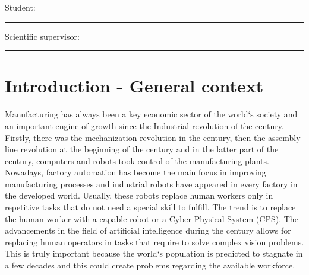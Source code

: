 \documentclass[12pt,a4paper,twoside]{report}
\newcommand{\uline}[1]{\rule[0pt]{#1}{0.4pt}}
\begin{document}
\hspace{6cm} Student: \uline{6cm} 

\vspace{0.5cm}

\hspace{6cm} Scientific supervisor: \uline{5cm} 




\newpage
{}
\tableofcontents
\newpage



\chapter{Introduction - General context}
\pagestyle{headings}
\setcounter{page}{1}

Manufacturing has always been a key economic sector of the world`s society and an important engine of growth since the Industrial revolution of the  century. Firstly,  there was the mechanization revolution in the  century, then the assembly line revolution at the beginning of the  century and in the latter part of the  century, computers and robots took control of the manufacturing plants. Nowadays, factory automation has become the main focus in improving manufacturing processes and industrial robots have appeared in every factory in the developed world. Usually, these robots replace human workers only in repetitive tasks that do not need a special skill to fulfill. The trend is to replace the human worker with a capable robot or a Cyber Physical System (CPS). The advancements in the field of artificial intelligence during the  century allows for replacing human operators in tasks that require to solve complex vision problems. This is truly important because the world`s population is predicted to stagnate in a few decades and this could create problems regarding the available workforce.
\end{document}
